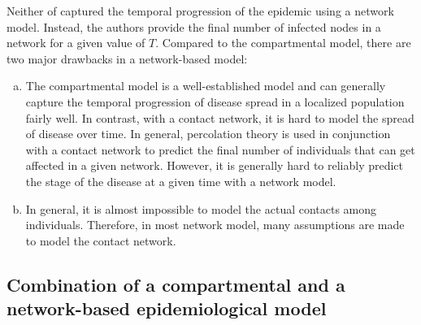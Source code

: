 \documentclass[10pt, journal,onecolumn]{IEEEtran}
\begin{document}
%
%
%
Neither of \citep{meyers2005network, newman2002spread} captured the temporal progression of the
epidemic using a network model. Instead, the authors provide the final number of infected nodes in a
network for a given value of $T$. Compared to the compartmental model, there are two major drawbacks
in a network-based model:

\begin{enumerate}[(a)] \item The compartmental model is a well-established model and can generally capture
      the temporal progression of disease spread in a localized population fairly well. In contrast,
      with a contact  network, it is hard to model the spread of disease over time. In general,
      percolation theory is used in conjunction with a contact network to predict the final number
      of individuals that can get affected in a given network. However, it is generally hard to
      reliably predict the stage of the disease at a given time with a network model.

\item In general, it is almost impossible to model the actual contacts among individuals. Therefore,
in most network model, many assumptions are made to model the contact network. \end{enumerate}

\subsection{{Combination of a compartmental and a network-based epidemiological model}}
\end{document}
